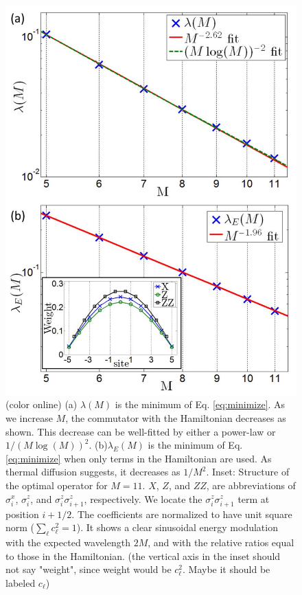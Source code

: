 \documentclass[twocolumn,superscriptaddress, prb]{revtex4-1}
\begin{document}
\begin{figure}
\includegraphics[width=0.95\linewidth]{fig_hamiltonian.pdf}
\centering
\caption{(color online) (a) $\lambda(M)$ is the minimum of Eq. \eqref{eq:minimize}.  As we increase $M$, the commutator with the Hamiltonian decreases as shown.
This decrease can be well-fitted by either a power-law or $1/(M\log(M))^2$.
(b)$\lambda_E(M)$ is the minimum of Eq. \eqref{eq:minimize} when only terms in the Hamiltonian are used.  As thermal diffusion suggests, it decreases as $1/M^2$. Inset: Structure of the optimal operator for $M = 11$. $X$, $Z$, and $ZZ$, are
abbreviations of $\sigma^x_i$, $\sigma^z_i$, and $\sigma^z_i \sigma^z_{i+1}$, respectively.
We locate the $\sigma^z_i \sigma^z_{i+1}$ term at position $i+1/2$.  The coefficients are normalized to have unit square norm ($\sum_\ell c_\ell^2 = 1$).
It shows a clear sinusoidal energy modulation with the expected wavelength $2M$, and with the relative ratios equal to those in the Hamiltonian.
(the vertical axis in the inset should not say "weight", since weight would be $c_{\ell}^2$.  Maybe it should be labeled $c_{\ell}$) }
\label{fig:hamiltonian}
\end{figure}
\end{document}
